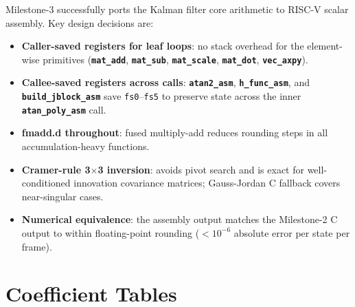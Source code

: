 \documentclass[12pt,a4paper]{article}
\newcommand{\reg}[1]{\texttt{\color{reg}#1}}
\newcommand{\func}[1]{\texttt{\bfseries #1}}
\begin{document}
Milestone-3 successfully ports the Kalman filter core arithmetic to
RISC-V scalar assembly. Key design decisions are:

\begin{itemize}[noitemsep]
  \item \textbf{Caller-saved registers for leaf loops}: no stack overhead
        for the element-wise primitives (\func{mat\_add}, \func{mat\_sub},
        \func{mat\_scale}, \func{mat\_dot}, \func{vec\_axpy}).
  \item \textbf{Callee-saved registers across calls}: \func{atan2\_asm},
        \func{h\_func\_asm}, and \func{build\_jblock\_asm} save
        \reg{fs0}--\reg{fs5} to preserve state across the inner
        \func{atan\_poly\_asm} call.
  \item \textbf{fmadd.d throughout}: fused multiply-add reduces
        rounding steps in all accumulation-heavy functions.
  \item \textbf{Cramer-rule 3$\times$3 inversion}: avoids pivot search
        and is exact for well-conditioned innovation covariance
        matrices; Gauss-Jordan C fallback covers near-singular cases.
  \item \textbf{Numerical equivalence}: the assembly output matches
        the Milestone-2 C output to within floating-point rounding
        ($< 10^{-6}$ absolute error per state per frame).
\end{itemize}

\appendix
\section{Coefficient Tables}
\end{document}
